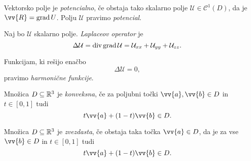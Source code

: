 \begin{definicija}
Vektorsko polje je \emph{potencialno}, če
obstaja tako skalarno polje $\mathcal{U} \in \mathcal{C}^1(D)$, da
je $\vv{R} = \grad U$. Polju $\mathcal{U}$ pravimo
\emph{potencial}.
\end{definicija}

\begin{definicija}
Naj bo $\mathcal{U}$ skalarno polje.
\emph{Laplaceov operator} je
\[
\Delta \mathcal{U} =
\operatorname{div} \operatorname{grad} \mathcal{U} =
\mathcal{U}_{xx} + \mathcal{U}_{yy} + \mathcal{U}_{zz}.
\]
\end{definicija}

\begin{definicija}
Funkcijam, ki rešijo enačbo
\[
\Delta \mathcal{U} = 0,
\]
pravimo \emph{harmonične funkcije}.
\end{definicija}

\begin{definicija}
Množica $D \subseteq \mathbb{R}^3$ je
\emph{konveksna}, če za poljubni točki
$\vv{a}, \vv{b} \in D$ in $t \in [0,1]$ tudi
\[
t \vv{a} + (1-t) \vv{b} \in D.
\]
\end{definicija}

\begin{definicija}
Množica $D \subseteq \mathbb{R}^3$ je
\emph{zvezdasta}, če obstaja taka točka
$\vv{a} \in D$, da je za vse $\vv{b} \in D$ in $t \in [0,1]$ tudi
\[
t \vv{a} + (1-t) \vv{b} \in D.
\]
\end{definicija}
